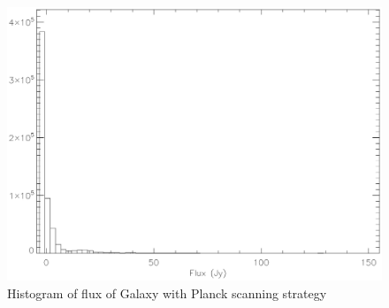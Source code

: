 \begin{figure}[h]
  \includegraphics[clip,angle=0,width=\columnwidth]{Figures/histo_galaxy_dipole_planck.eps}
  \caption{Histogram of flux of Galaxy with Planck scanning strategy}
  \label{fig:histo_galaxy_dipole}
\end{figure}

%


